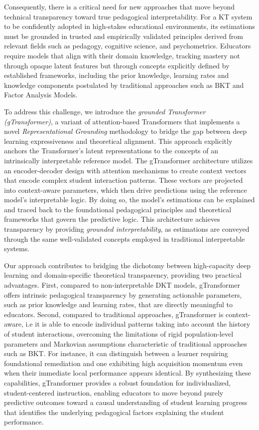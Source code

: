 \documentclass[applsci,article,submit,moreauthors,pdftex]{Definitions/mdpi}
\begin{document}
Consequently, there is a critical need for new approaches that move beyond technical transparency toward true pedagogical interpretability. For a KT system to be confidently adopted in high-stakes educational environments, its estimations must be grounded in trusted and empirically validated principles derived from relevant fields such as pedagogy, cognitive science, and psychometrics. Educators require models that align with their domain knowledge, tracking mastery not through opaque latent features but through concepts explicitly defined by established frameworks, including the prior knowledge, learning rates and knowledge components postulated by traditional approaches such as BKT and Factor Analysis Models.

To address this challenge, we introduce the \textit{grounded Transformer (gTransformer)}, a variant of attention-based Transformers that implements a novel \textit{Representational Grounding} methodology to bridge the gap between deep learning expressiveness and theoretical alignment. This approach explicitly anchors the Transformer’s latent representations to the concepts of an intrinsically interpretable reference model. The gTransformer architecture utilizes an encoder-decoder design with attention mechanisms to create context vectors that encode complex student interaction patterns. These vectors are projected into context-aware parameters, which then drive predictions using the reference model's interpretable logic. By doing so, the model's estimations can be explained and traced back to the foundational pedagogical principles and theoretical frameworks that govern the predictive logic. This architecture achieves transparency by providing \textit{grounded interpretability}, as estimations are conveyed through the same well-validated concepts employed in traditional interpretable systems. 

Our approach contributes to bridging the dichotomy between high-capacity deep learning and domain-specific theoretical transparency, providing two practical advantages. First, compared to non-interpretable DKT models, gTransformer offers intrinsic pedagogical transparency by generating actionable parameters, such as prior knowledge and learning rates, that are directly meaningful to educators. Second, compared to traditional approaches, gTransformer is context-aware, i.e it is able to encode individual patterns taking into account the history of student interactions, overcoming the limitations of rigid population-level parameters and Markovian assumptions characteristic of traditional approaches such as BKT. For instance, it can distinguish between a learner requiring foundational remediation and one exhibiting high acquisition momentum even when their immediate local performance appears identical. By synthesizing these capabilities, gTransformer provides a robust foundation for individualized, student-centered instruction, enabling educators to move beyond purely predictive outcomes toward a causal understanding of student learning progress that identifies the underlying pedagogical factors explaining the student performance.
\end{document}
